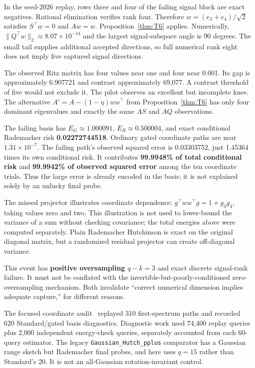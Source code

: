 In the seed-2026 replay, rows three and four of the failing signal block are exact negatives. Rational elimination verifies rank four. Therefore $w=(e_3+e_4)/\sqrt2$ satisfies $S^\top w=0$ and $Aw=w$. Proposition~\ref{thm:T6} applies. Numerically, $\|Q^\top w\|_2\approx8.07\times10^{-14}$ and the largest signal-subspace angle is 90 degrees. The small tail supplies additional accepted directions, so full numerical rank eight does not imply five captured signal directions.


The observed Ritz matrix has four values near one and four near 0.001. Its gap is approximately 6.907721 and contrast approximately 69,077. A contrast threshold of five would not exclude it. The pilot observes an excellent but incomplete knee. The alternative $A'=A-(1-\eta)ww^\top$ from Proposition~\ref{thm:T6} has only four dominant eigenvalues and exactly the same $AS$ and $AQ$ observations.


The failing basis has $E_G\approx1.000091$, $E_R\approx0.500004$, and exact conditional Rademacher risk \textbf{0.02272744518}. Ordinary gated coordinate paths are near \textbf{$1.31\times10^{-7}$}. The failing path's observed squared error is 0.03303752, just 1.45364 times its own conditional risk. It contributes \textbf{99.9948\% of total conditional risk} and \textbf{99.9942\% of observed squared error} among the ten coordinate trials. Thus the large error is already encoded in the basis; it is not explained solely by an unlucky final probe.


The missed projector illustrates coordinate dependence: $g^\top ww^\top g=1+g_3g_4$, taking values zero and two. This illustration is not used to lower-bound the variance of a sum without checking covariance; the total energies above were computed separately. Plain Rademacher Hutchinson is exact on the original diagonal matrix, but a randomized residual projector can create off-diagonal variance.


This event has \textbf{positive oversampling $q-k=3$} and exact discrete signal-rank failure. It must not be conflated with the invertible-but-poorly-conditioned zero-oversampling mechanism. Both invalidate ``correct numerical dimension implies adequate capture,'' for different reasons.


The focused coordinate audit~\cite{project2026} replayed 310 first-spectrum paths and recorded 620 Standard/gated basis diagnostics. Diagnostic work used 74,400 replay queries plus 2,000 independent energy-check queries, separately accounted from each 60-query estimator. The legacy \texttt{Gaussian\_Hutch\_pplus} comparator has a Gaussian range sketch but Rademacher final probes, and here uses $q=15$ rather than Standard's 20. It is not an all-Gaussian rotation-invariant control.

